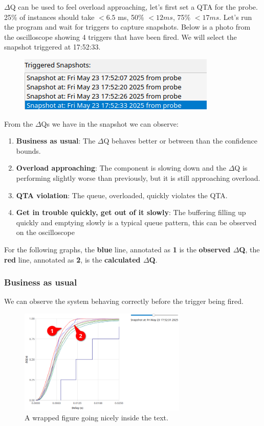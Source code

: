         $\Delta$Q can be used to feel overload approaching, let's first set a QTA for the probe. 25\% of instances should take $< 6.5$ ms, 50\% $<12 ms$, 75\% $<17 ms$. Let's run the program and wait for triggers to capture snapshots. Below is a photo from the oscilloscope showing 4 triggers that have been fired. We will select the snapshot triggered at 17:52:33.
        \begin{figure}[H]
            \begin{center}
                \includegraphics[scale = 0.4]{img/snapshots.png}
            \end{center}
        \end{figure}
        From the $\Delta$Qs we have in the snapshot we can observe:
        \begin{enumerate}
            \item \textbf{Business as usual}: The $\Delta$Q behaves better or between than the confidence bounds.
            \item \textbf{Overload approaching}: The component is slowing down and the $\Delta$Q is performing slightly worse than previously, but it is still approaching overload.
            \item \textbf{QTA violation}: The queue, overloaded, quickly violates the QTA.
            \item \textbf{Get in trouble quickly, get out of it slowly}: The buffering filling up quickly and emptying slowly is a typical queue pattern, this can be observed on the oscilloscope
        \end{enumerate}
        
        For the following graphs, the \textbf{blue} line, annotated as \textbf{1} is the \textbf{observed $\Delta$Q}, the \textbf{red} line, annotated as \textbf{2}, is the \textbf{calculated $\Delta$Q}. 
        \subsubsection{Business as usual}
            We can observe the system behaving correctly before the trigger being fired.
            
        \begin{figure}
            \caption{A wrapped figure going nicely inside the text.}\label{wrap-fig:1}
            \includegraphics[width=8cm]{img/trigger_normal_exec.png}
        \end{figure} 

